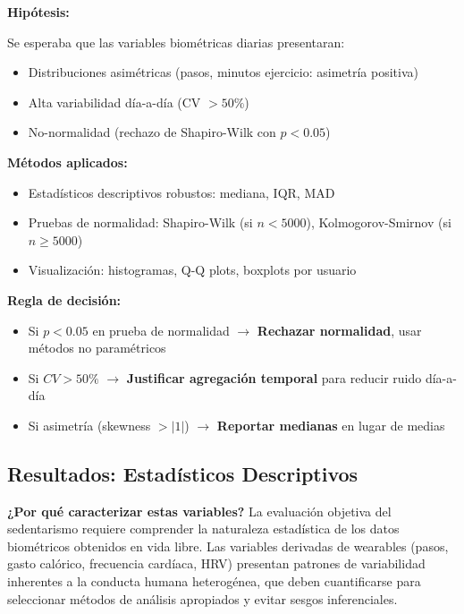 \documentclass[12pt,letterpaper,twoside]{report}
\begin{document}
\begin{hipotesisbox}
\textbf{Hipótesis:}

Se esperaba que las variables biométricas diarias presentaran:
\begin{itemize}[noitemsep]
    \item Distribuciones asimétricas (pasos, minutos ejercicio: asimetría positiva)
    \item Alta variabilidad día-a-día (CV $> 50\%$)
    \item No-normalidad (rechazo de Shapiro-Wilk con $p<0.05$)
\end{itemize}
\end{hipotesisbox}

\begin{estadisticobox}
\textbf{Métodos aplicados:}

\begin{itemize}[noitemsep]
    \item Estadísticos descriptivos robustos: mediana, IQR, MAD
    \item Pruebas de normalidad: Shapiro-Wilk (si $n<5000$), Kolmogorov-Smirnov (si $n \geq 5000$)
    \item Visualización: histogramas, Q-Q plots, boxplots por usuario
\end{itemize}
\end{estadisticobox}

\begin{reglabox}
\textbf{Regla de decisión:}

\begin{itemize}[noitemsep]
    \item Si $p < 0.05$ en prueba de normalidad $\to$ \textbf{Rechazar normalidad}, usar métodos no paramétricos
    \item Si $CV > 50\%$ $\to$ \textbf{Justificar agregación temporal} para reducir ruido día-a-día
    \item Si asimetría (skewness $> |1|$) $\to$ \textbf{Reportar medianas} en lugar de medias
\end{itemize}
\end{reglabox}

\subsection{Resultados: Estadísticos Descriptivos}

\textbf{¿Por qué caracterizar estas variables?} La evaluación objetiva del sedentarismo requiere comprender la naturaleza estadística de los datos biométricos obtenidos en vida libre. Las variables derivadas de wearables (pasos, gasto calórico, frecuencia cardíaca, HRV) presentan patrones de variabilidad inherentes a la conducta humana heterogénea, que deben cuantificarse para seleccionar métodos de análisis apropiados y evitar sesgos inferenciales.
\end{document}
